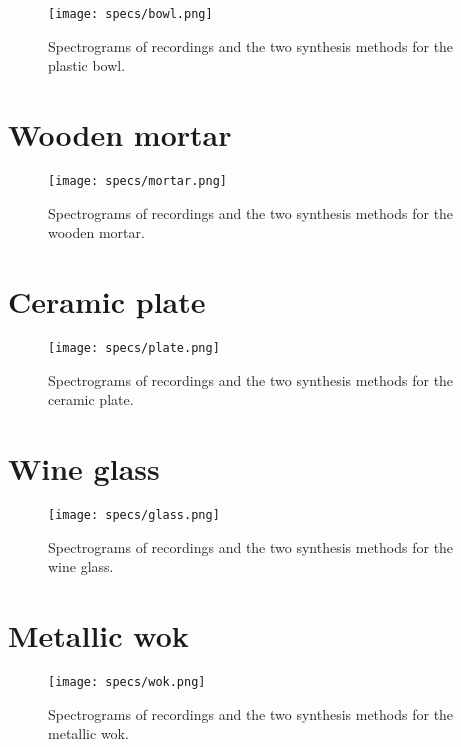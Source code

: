 \begin{figure}[H]
  \centering
    \texttt{[image: specs/bowl.png]}
      \caption{Spectrograms of recordings and the two synthesis methods for the plastic bowl.}
      \label{fig:sp_bowl}
\end{figure}

\newpage

\section*{Wooden mortar}

\begin{figure}[H]
  \centering
    \texttt{[image: specs/mortar.png]}
      \caption{Spectrograms of recordings and the two synthesis methods for the wooden mortar.}
      \label{fig:sp_mortar}
\end{figure}

\newpage

\section*{Ceramic plate}

\begin{figure}[H]
  \centering
    \texttt{[image: specs/plate.png]}
      \caption{Spectrograms of recordings and the two synthesis methods for the ceramic plate.}
      \label{fig:sp_plate}
\end{figure}

\newpage

\section*{Wine glass}

\begin{figure}[H]
  \centering
    \texttt{[image: specs/glass.png]}
      \caption{Spectrograms of recordings and the two synthesis methods for the wine glass.}
      \label{fig:sp_glass}
\end{figure}

\newpage

\section*{Metallic wok}

\begin{figure}[H]
  \centering
    \texttt{[image: specs/wok.png]}
      \caption{Spectrograms of recordings and the two synthesis methods for the metallic wok.}
      \label{fig:sp_wok}
\end{figure}

